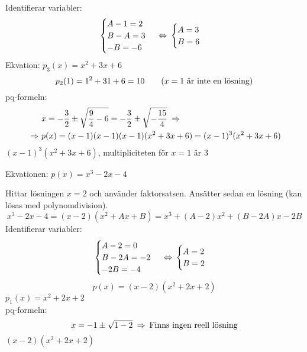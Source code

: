 \begin{task}{2.37}
\begin{align*}
	\end{align*}
	Identifierar variabler:
	\[\begin{cases}
	A-1=2 \\
	B-A=3 \\
	-B=-6
	\end{cases}
	\lra
	\begin{cases}
	A=3 \\
	B=6
	\end{cases}\]
	Ekvation: $p_3(x)=x^2+3x+6$
	\[p_2(1)=1^2+3\*1+6=10 \text{\qquad($x=1$ är inte en lösning)}\]
	pq-formeln:
	\begin{align*}
	&x=-\frac{3}{2}\pm\sqrt{\frac{9}{4}-6}=
	-\frac{3}{2}\pm\sqrt{-\frac{15}{4}} \ra \\ \ra
	&p(x)=(x-1)(x-1)(x-1)(x^2+3x+6)=(x-1)^3(x^2+3x+6)
	\end{align*}
	\ans $(x-1)^3(x^2+3x+6)$, multipliciteten för $x=1$ är 3
\end{task}

\begin{task}{2.38}
	Ekvationen: $p(x)=x^3-2x-4$
	
	Hittar lösningen $x=2$ och använder faktorsatsen. Ansätter sedan en lösning (kan lösas med polynomdivision).
	\[x^3-2x-4=(x-2)(x^2+Ax+B)=x^3+(A-2)x^2+(B-2A)x-2B\]
	Identifierar variabler:
	\[\begin{cases}
	A-2=0 \\
	B-2A=-2 \\
	-2B=-4
	\end{cases}
	\lra
	\begin{cases}
	A=2 \\
	B=2
	\end{cases}\]
	\[p(x)=(x-2)(x^2+2x+2)\]
	$p_1(x)=x^2+2x+2$ \\
	pq-formeln:
	\[x=-1\pm\sqrt{1-2} \ra \text{Finns ingen reell lösning}\]
	\ans $(x-2)(x^2+2x+2)$
\end{task}
